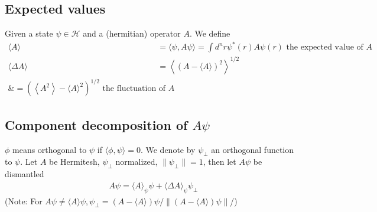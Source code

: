 \subsection{Expected values}
Given a state $\psi\in\mathcal{H}$ and a (hermitian) operator $A$. We define
\begin{equation}
\begin{aligned}\langle A\rangle &=\langle\psi, A \psi\rangle=\int d^{n} r \psi^{*}(r) A \psi(r) \text { the expected value of } A \\\langle\Delta A\rangle &=\left\langle(A-\langle A\rangle)^{2}\right\rangle^{1 / 2} \\ \&=\left(\left\langle A^{2}\right\rangle-\langle A\rangle^{2}\right)^{1 / 2} \text { the fluctuation of } A \end{aligned}
\end{equation}

\subsection{Component decomposition of $A\psi$}
$\phi$ means orthogonal to $\psi$ if $\langle\phi,\psi\rangle=0$. We denote by $\psi_{\bot}$ an orthogonal function to $\psi$. Let $A$ be Hermitesh, $\psi_{\bot}$ normalized, $\parallel\psi_{\bot}\parallel=1$, then let $A\psi$ be dismantled
\begin{equation}
\begin{array}{c}{A \psi=\langle A\rangle_{\psi} \psi+\langle\Delta A\rangle_{\psi} \psi_{\perp}} \end{array}
\end{equation}
(Note: For $A\psi\neq\langle A\rangle\psi, \psi_{\bot}=(A-\langle A\rangle)\psi/\parallel(A-\langle A\rangle)\psi\parallel$/)
